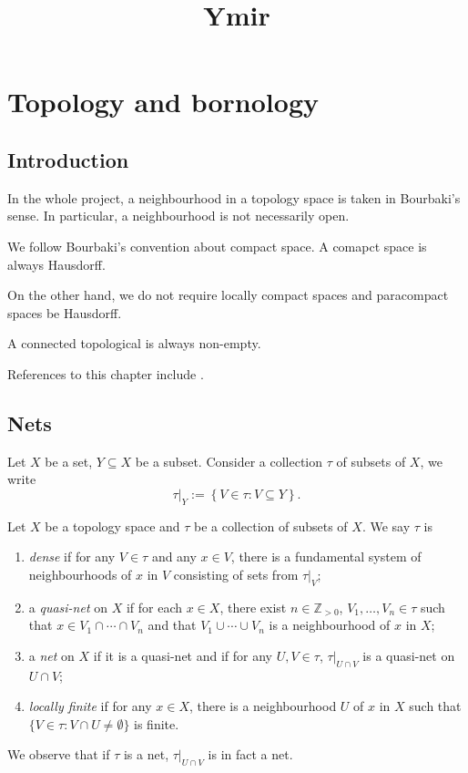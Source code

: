 
\title{Ymir}

\maketitle
\tableofcontents

\chapter*{Topology and bornology}\label{chap-topology}

\section{Introduction}\label{sec-introduction}

In the whole project, a neighbourhood in a topology space is taken in Bourbaki's sense. In particular, a neighbourhood is not necessarily open.

We follow Bourbaki's convention about compact space. A comapct space is always Hausdorff. 

On the other hand, we do not require locally compact spaces and paracompact spaces be Hausdorff.

A connected topological is always non-empty.

References to this chapter include \cite{Berk93}.

\section{Nets}\label{sec-nets}

Let $X$ be a set, $Y\subseteq X$ be a subset. Consider a collection $\tau$ of subsets of $X$, we write
\[
    \tau|_Y:=\left\{V\in \tau: V\subseteq Y \right\}.    
\]

\begin{definition}
    Let $X$ be a topology space and $\tau$ be a collection of subsets of $X$. We say $\tau$ is
    \begin{enumerate}
        \item \emph{dense} if for any $V\in \tau$ and any $x\in V$, there is a fundamental system of neighbourhoods of $x$ in $V$ consisting of sets from $\tau|_V$;
        \item a \emph{quasi-net} on $X$ if for each $x\in X$, there exist $n\in \mathbb{Z}_{>0}$, $V_1,\ldots,V_n\in \tau$ such that $x\in V_1\cap \cdots\cap V_n$ and that $V_1\cup\cdots\cup V_n$ is a neighbourhood of $x$ in $X$;
        \item a \emph{net} on $X$ if it is a quasi-net and if for any $U,V\in \tau$, $\tau|_{U\cap V}$ is a quasi-net on $U\cap V$;
        \item \emph{locally finite} if for any $x\in X$, there is a neighbourhood $U$ of $x$ in $X$ such that $\{V\in \tau:V\cap U\neq \emptyset\}$ is finite.
    \end{enumerate}
\end{definition}
We observe that if $\tau$ is a net, $\tau|_{U\cap V}$ is in fact a net.

